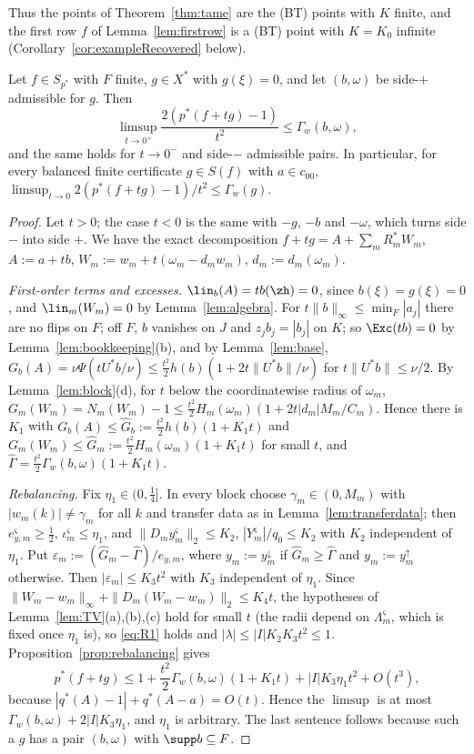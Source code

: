 Thus the points of Theorem~\ref{thm:tame} are the \textup{(BT)} points with
$K$ finite, and the first row $f$ of Lemma~\ref{lem:firstrow} is a
\textup{(BT)} point with $K=K_0$ infinite
(Corollary~\ref{cor:exampleRecovered} below).

\begin{proposition}\label{prop:onesidedupper}
Let $f\in S_{p^*}$ with $F$ finite, $g\in X^*$ with $g(\xi)=0$, and let
$(b,\omega)$ be side-$+$ admissible for $g$.  Then
\[
 \limsup_{t\to0^+}\frac{2(p^*(f+tg)-1)}{t^2}\le\Gamma_w(b,\omega),
\]
and the same holds for $t\to0^-$ and side-$-$ admissible pairs.  In
particular, for every balanced finite certificate $g\in S(f)$ with
$a\in c_{00}$, $\limsup_{t\to0}2(p^*(f+tg)-1)/t^2\le\Gamma_w(g)$.
\end{proposition}

\begin{proof}
Let $t>0$; the case $t<0$ is the same with $-g$, $-b$ and $-\omega$, which
turns side $-$ into side $+$.  We have the exact decomposition
$f+tg=A+\sum_mR_m^*W_m$, $A:=a+tb$, $W_m:=w_m+t(\omega_m-d_mw_m)$,
$d_m:=d_m(\omega_m)$.

\emph{First-order terms and excesses.}  $\lin_b(A)=tb(\zh)=0$, since
$b(\xi)=g(\xi)=0$, and $\lin_m(W_m)=0$ by Lemma~\ref{lem:algebra}.  For
$t\|b\|_\infty\le\min_F|a_j|$ there are no flips on $F$; off $F$, $b$
vanishes on $J$ and $z_jb_j=|b_j|$ on $K$; so $\Exc(tb)=0$ by
Lemma~\ref{lem:bookkeeping}(b), and by Lemma~\ref{lem:base},
$G_b(A)=\nu\Psi(tU^*b/\nu)\le\frac{t^2}2h(b)(1+2t\|U^*b\|/\nu)$ for
$t\|U^*b\|\le\nu/2$.  By Lemma~\ref{lem:block}(d), for $t$ below the
coordinatewise radius of $\omega_m$,
$G_m(W_m)=N_m(W_m)-1\le\frac{t^2}2H_m(\omega_m)(1+2t|d_m|M_m/C_m)$.  Hence
there is $K_1$ with $G_b(A)\le\hat G_b:=\frac{t^2}2h(b)(1+K_1t)$ and
$G_m(W_m)\le\hat G_m:=\frac{t^2}2H_m(\omega_m)(1+K_1t)$ for small $t$, and
$\hat\Gamma=\frac{t^2}2\Gamma_w(b,\omega)(1+K_1t)$.

\emph{Rebalancing.}  Fix $\eta_1\in(0,\frac14]$.  In every block choose
$\gamma_m\in(0,M_m)$ with $|w_m(k)|\ne\gamma_m$ for all $k$ and transfer
data as in Lemma~\ref{lem:transferdata}; then $e^\varsigma_{y,m}\ge
\frac12$, $\iota^\varsigma_m\le\eta_1$, and $\|D_my^\varsigma_m\|_2\le K_2$,
$|Y^\varsigma_m|/q_0\le K_2$ with $K_2$ independent of $\eta_1$.  Put
$\varepsilon_m:=(\hat G_m-\hat\Gamma)/e_{y,m}$, where $y_m:=y^\downarrow_m$
if $\hat G_m\ge\hat\Gamma$ and $y_m:=y^\uparrow_m$ otherwise.  Then
$|\varepsilon_m|\le K_3t^2$ with $K_3$ independent of $\eta_1$.  Since
$\|W_m-w_m\|_\infty+\|D_m(W_m-w_m)\|_2\le K_4t$, the hypotheses of
Lemma~\ref{lem:TV}(a),(b),(c) hold for small $t$ (the radii depend on
$\Lambda^\varsigma_m$, which is fixed once $\eta_1$ is), so \eqref{eq:R1}
holds and $|\lambda|\le|I|K_2K_3t^2\le1$.  Proposition~\ref{prop:rebalancing}
gives
\[
 p^*(f+tg)\le1+\frac{t^2}2\Gamma_w(b,\omega)(1+K_1t)+|I|K_3\eta_1t^2+O(t^3),
\]
because $|q^*(A)-1|+q^*(A-a)=O(t)$.  Hence the $\limsup$ is at most
$\Gamma_w(b,\omega)+2|I|K_3\eta_1$, and $\eta_1$ is arbitrary.  The last
sentence follows because such a $g$ has a pair $(b,\omega)$ with $\supp
b\subseteq F$.
\end{proof}

